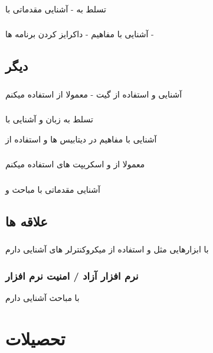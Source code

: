 \documentclass{article}
\begin{document}
\subsubsection{}
تسلط به   -  آشنایی مقدماتی با 
\subsubsection{}
آشنایی با مفاهیم  - داکرایز کردن برنامه ها
- 
\subsection{دیگر}
\subsubsection{}
آشنایی و استفاده از گیت - معمولا از  استفاده میکنم
\subsubsection{}
تسلط به زبان  و آشنایی با  

آشنایی با مفاهیم  در دیتابیس ها و استفاده از 
\subsubsection{}
معمولا از  و اسکریپت های  استفاده میکنم
\subsubsection{}
آشنایی مقدماتی با مباحث  و 
\subsection{علاقه ها}
\subsubsection{}
با ابزارهایی مثل  و استفاده از میکروکنترلر های  آشنایی دارم
\subsubsection{نرم افزار آزاد / امنیت نرم افزار}
با مباحث  آشنایی دارم
\section{تحصیلات} %
\end{document}
